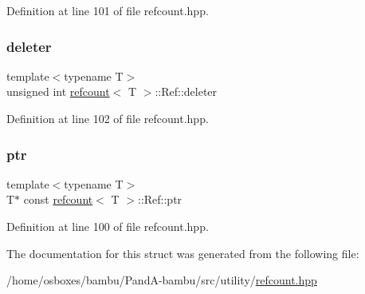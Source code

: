 Definition at line 101 of file refcount.\+hpp.

\mbox{\label{structrefcount_1_1Ref_ad7fc9f0038e4ea880e726c46d4066cce}} 
\subsubsection{\texorpdfstring{deleter}{deleter}}
{\footnotesize\ttfamily template$<$typename T$>$ \\
unsigned int \hyperlink{structrefcount}{refcount}$<$ T $>$\+::Ref\+::deleter}



Definition at line 102 of file refcount.\+hpp.

\mbox{\label{structrefcount_1_1Ref_a7654efec68cf42693832a4f61290047d}} 
\subsubsection{\texorpdfstring{ptr}{ptr}}
{\footnotesize\ttfamily template$<$typename T$>$ \\
T$\ast$ const \hyperlink{structrefcount}{refcount}$<$ T $>$\+::Ref\+::ptr}



Definition at line 100 of file refcount.\+hpp.



The documentation for this struct was generated from the following file\+:\begin{DoxyCompactItemize}
\item 
/home/osboxes/bambu/\+Pand\+A-\/bambu/src/utility/\hyperlink{refcount_8hpp}{refcount.\+hpp}\end{DoxyCompactItemize}
